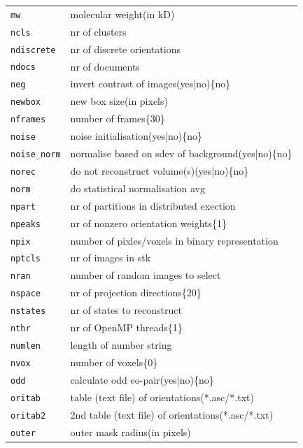 \documentclass[a4paper,11pt]{article}
\begin{document}
\begin{tabular}{ll}
\texttt{mw}&{molecular weight(in kD)}\\
\texttt{ncls}&{nr of clusters}\\
\texttt{ndiscrete}&{nr of discrete orientations}\\
\texttt{ndocs}&{nr of documents}\\
\texttt{neg}&{invert contrast of images(yes|no)\{no\}}\\
\texttt{newbox}&{new box size(in pixels)}\\
\texttt{nframes}&{number of frames\{30\}}\\
\texttt{noise}&{noise initialisation(yes|no)\{no\}}\\
\texttt{noise\_norm}&{normalise based on sdev of background(yes|no)\{no\}}\\
\texttt{norec}&{do not reconstruct volume(s)(yes|no)\{no\}}\\
\texttt{norm}&{do statistical normalisation avg}\\
\texttt{npart}&{nr of partitions in distributed exection}\\
\texttt{npeaks}&{nr of nonzero orientation weights\{1\}}\\
\texttt{npix}&{number of pixles/voxels in binary representation}\\
\texttt{nptcls}&{nr of images in stk}\\
\texttt{nran}&{number of random images to select}\\
\texttt{nspace}&{nr of projection directions\{20\}}\\
\texttt{nstates}&{nr of states to reconstruct}\\
\texttt{nthr}&{nr of OpenMP threads\{1\}}\\
\texttt{numlen}&{length of number string}\\
\texttt{nvox}&{number of voxels\{0\}}\\
\texttt{odd}&{calculate odd eo-pair(yes|no)\{no\}}\\
\texttt{oritab}&{table (text file) of orientations(*.asc/*.txt)}\\
\texttt{oritab2}&{2nd table (text file) of orientations(*.asc/*.txt)}\\
\texttt{outer}&{outer mask radius(in pixels)}\\
\end{tabular}
\end{document}
